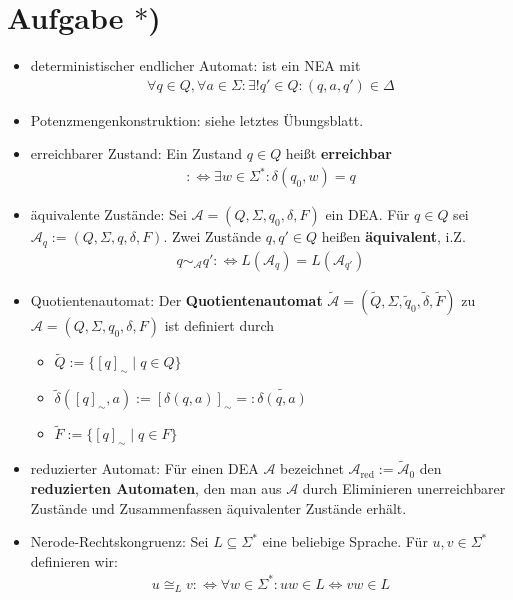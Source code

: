 \documentclass[12pt,a4paper]{article}
\author{Willi Sontopski}
\newcommand{\A}{\mathcal{A}}
\begin{document}

\section*{Aufgabe $\ast$)}
\begin{itemize}
\item deterministischer endlicher Automat: ist ein NEA mit
\begin{align*}
	\forall q\in Q,\forall a\in\Sigma:\exists! q'\in Q:(q,a,q')\in\Delta
\end{align*}
\item Potenzmengenkonstruktion: siehe letztes Übungsblatt.
\item erreichbarer Zustand: Ein Zustand $q\in Q$ heißt \textbf{erreichbar}
\begin{align*}
	:\Longleftrightarrow\exists w\in\Sigma^\ast:\delta(q_0,w)=q
\end{align*}
\item äquivalente Zustände: Sei $\A=(Q,\Sigma,q_0,\delta,F)$ ein DEA. Für $q\in Q$ sei $\A_q:=(Q,\Sigma,q,\delta,F)$. Zwei Zustände $q,q'\in Q$ heißen \textbf{äquivalent}, i.Z. 
\begin{align*}
	q\sim_\A q':\Longleftrightarrow L(\A_q)=L(\A_{q'})
\end{align*}
\item Quotientenautomat: Der \textbf{Quotientenautomat} $\tilde{\A}=(\tilde{Q},\Sigma,\tilde{q}_0,\tilde{\delta},\tilde{F})$ zu $\A=(Q,\Sigma,q_0,\delta,F)$ ist definiert durch
\begin{itemize}
\item $\tilde{Q}:=\lbrace[q]_\sim\mid q\in Q\rbrace$
\item $\tilde{\delta}([q]_\sim,a):=[\delta(q,a)]_\sim=:\widetilde{\delta(q,a)}$
\item $\tilde{F}:=\lbrace[q]_\sim\mid q\in F\rbrace$
\end{itemize}
\item reduzierter Automat: Für einen DEA $\A$ bezeichnet $\A_{\text{red}}:=\tilde{\A}_0$ den \textbf{reduzierten Automaten}, den man aus $\A$ durch Eliminieren unerreichbarer Zustände und Zusammenfassen äquivalenter Zustände erhält.
\item Nerode-Rechtskongruenz: Sei $L\subseteq\Sigma^\ast$ eine beliebige Sprache. Für $u,v\in\Sigma^\ast$ definieren wir:
\begin{align*}
	u\cong_L v:\Longleftrightarrow\forall w\in\Sigma^\ast:uw\in L\Leftrightarrow vw\in L
\end{align*}
\end{itemize}
\end{document}
